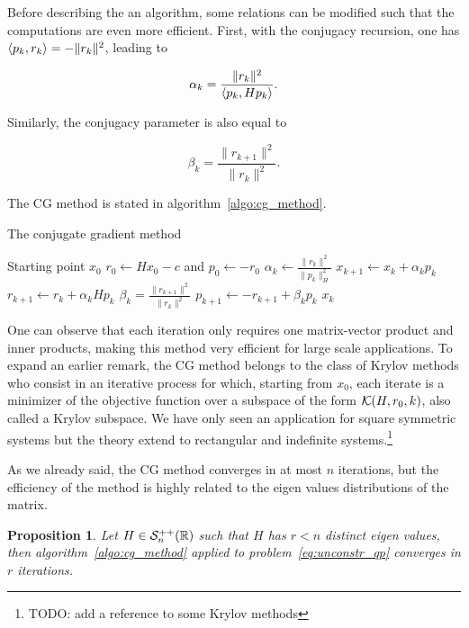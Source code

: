 \documentclass[10pt]{article}
\newtheorem{proposition}[theorem]{Proposition}
\numberwithin{equation}{section}
\begin{document}
	Before describing the an algorithm, some relations can be modified such that the computations are even more efficient. First, with the conjugacy recursion, one has $\left\langle {p_k} , {r_k} \right\rangle = - \|r_k\|^2$, leading to 
	
	\[\alpha_k = \dfrac{\|r_k\|^2}{\left\langle {p_k} , {Hp_k} \right\rangle}.\]
	
	Similarly, the conjugacy parameter is also equal to 
	
	\[\beta_k = \dfrac{\|r_{k+1}\|^2}{\|r_k\|^2}.\]
	
	The CG method is stated in algorithm~\ref{algo:cg_method}.
	
	\begin{algorithm}
		\caption{The conjugate gradient method}\label{algo:cg_method}
		  
		\begin{algorithmic}
			\Require Starting point $x_0$
			\State $r_0 \gets Hx_0-c$ and $p_0 \gets -r_0$
				\State $\alpha_k \gets \frac{\|r_k\|^2}{\|p_k\|^2_H}$
				\State $x_{k+1} \gets x_k+\alpha_kp_k$
				\State $r_{k+1} \gets r_k + \alpha_kHp_k$
				\State $\beta_k =  \frac{\|r_{k+1}\|^2}{\|r_k\|^2}$
				\State $p_{k+1} \gets -r_{k+1}+\beta_kp_k$
			\EndFor{}
			\Return $x_k$
		\end{algorithmic}
	\end{algorithm} 
	
	 One can observe that each iteration only requires one matrix-vector product and inner products, making this method very efficient for large scale applications. To expand an earlier remark, the CG method belongs to the class of Krylov methods who consist in an iterative process for which, starting from $x_0$, each iterate is a minimizer of the objective function over a subspace of the form ${\mathcal{K}}(H,r_0,k)$, also called a Krylov subspace. We have only seen an application for square symmetric systems but the theory extend to rectangular and indefinite systems.\footnote{TODO: add a reference to some Krylov methods}
	 
	 As we already said, the CG method converges in at most $n$ iterations, but the efficiency of the method is highly related to the eigen values distributions of the matrix.
	 
	 \begin{proposition}
	 	Let $H\in {\mathcal{S}}_n^{++}({\mathbb{R}})$ such that $H$ has $r<n$ distinct eigen values, then algorithm~\ref{algo:cg_method} applied to problem~\eqref{eq:unconstr_qp} converges in $r$ iterations. 
	 \end{proposition}
	 
\end{document}
